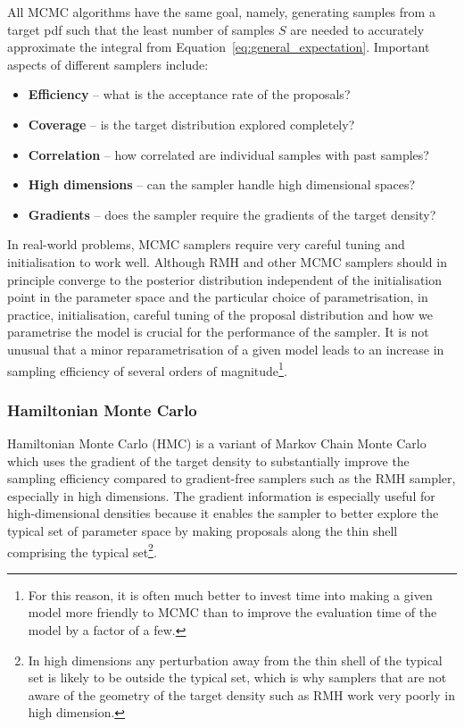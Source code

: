 \documentclass[12pt,dvipsnames]{report}
\begin{document}
All MCMC algorithms have the same goal, namely, generating samples from a
target pdf such that the least number of samples $S$ are needed to accurately
approximate the integral from Equation~\ref{eq:general_expectation}. 
Important aspects of different samplers include:
\begin{itemize}
    \item \textbf{Efficiency} -- what is the acceptance rate of the proposals?
    \item \textbf{Coverage} -- is the target distribution explored completely?
    \item \textbf{Correlation} -- how correlated are individual samples with past samples?
    \item \textbf{High dimensions} -- can the sampler handle high dimensional spaces?
    \item \textbf{Gradients} -- does the sampler require the gradients of the target density? 
\end{itemize}
In real-world problems, MCMC samplers require very careful tuning and initialisation 
to work well. Although RMH and other MCMC samplers should in principle converge to the posterior distribution 
independent of the initialisation point in the parameter space and the particular 
choice of parametrisation, in practice, initialisation, careful tuning of the proposal 
distribution and how we parametrise the model is crucial for the performance 
of the sampler. It is not unusual that a minor reparametrisation of a given model leads 
to an increase in sampling efficiency of several orders of magnitude\footnote{For this
reason, it is often much better to invest time into making a given model more friendly 
to MCMC than to improve the evaluation time of the model by a factor of a few.}.


\subsubsection{Hamiltonian Monte Carlo}
Hamiltonian Monte Carlo (HMC) \citep{1987PhLB..195..216D,arXiv:1206.1901} is a 
variant of  Markov Chain Monte Carlo which uses the gradient of the target 
density to substantially  improve the sampling efficiency compared to 
gradient-free samplers such as the RMH sampler, especially in high dimensions.
The gradient information is especially useful for high-dimensional densities 
because it enables the sampler to better 
explore the typical set of parameter space by making proposals along 
the thin shell comprising the typical set\footnote{In high dimensions any
perturbation away from the thin shell of the typical set is likely to be 
outside the typical set, which is why samplers that are not aware of the 
geometry of the target density such as RMH work very poorly in high dimension.}.
\end{document}

